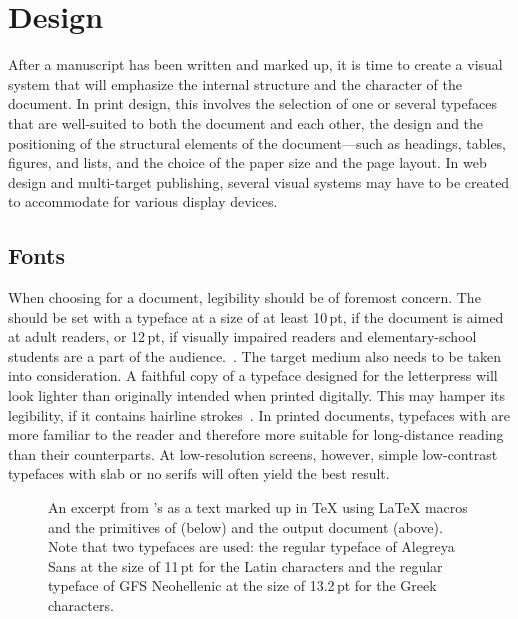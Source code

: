 \chapter{Design}
After a manuscript has been written and marked up, it is time to create a visual
system that will emphasize the internal structure and the character of the
document. In print design, this involves the selection of one or several
typefaces that are well-suited to both the document and each other, the design
and the positioning of the structural elements of the document---such as
headings, tables, figures, and lists, and the choice of the paper size and the
page layout. In web design and multi-target publishing, several visual systems
may have to be created to accommodate for various display devices.

\section{Fonts}
When choosing  for a document, legibility should be of foremost
concern. The  should be set with a typeface at a size of at least
10\,pt, if the document is aimed at adult readers, or 12\,pt, if visually
impaired readers and elementary-school students are a part of the
audience.~\cite[para.\,13--15]{kapr99}. The target medium also needs to be taken
into consideration. A faithful copy of a typeface designed for the letterpress
will look lighter than originally intended when printed digitally. This may
hamper its legibility, if it contains hairline
strokes~\cite[sec.~6.1.2]{bringhurst92}. In printed documents, typefaces with
 are more familiar to the reader and therefore more suitable for
long-distance reading than their  counterparts. At
low-resolution screens, however, simple low-contrast typefaces with slab or no
serifs will often yield the best result.

\begin{figure}
  \vspace{.9em}
  \caption{An excerpt from 's  as a
    text marked up in \TeX{} using \LaTeX{}
    macros and the primitives of 
    (below) and the output document (above). Note that two typefaces are used:
    the regular typeface of Alegreya Sans at the size of 11\,pt for the Latin
    characters and the regular typeface of GFS Neohellenic at the size of
    13.2\,pt for the Greek characters.}
  \label{fig:cornford12}
\end{figure}

